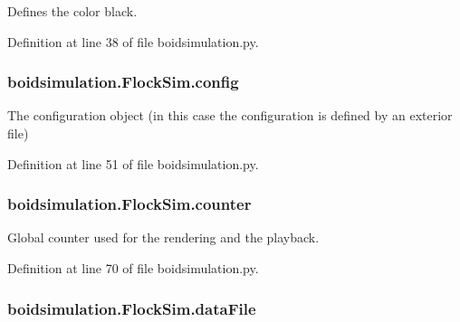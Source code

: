 Defines the color black. 



Definition at line 38 of file boidsimulation.\-py.

\hypertarget{classboidsimulation_1_1FlockSim_abf487d6e84851334a79656b5df3c8492}{
\subsubsection[{config}]{\setlength{\rightskip}{0pt plus 5cm}boidsimulation.\-Flock\-Sim.\-config}}\label{classboidsimulation_1_1FlockSim_abf487d6e84851334a79656b5df3c8492}


The configuration object (in this case the configuration is defined by an exterior file) 



Definition at line 51 of file boidsimulation.\-py.

\hypertarget{classboidsimulation_1_1FlockSim_af378fd310919691dec50f5d312931726}{
\subsubsection[{counter}]{\setlength{\rightskip}{0pt plus 5cm}boidsimulation.\-Flock\-Sim.\-counter}}\label{classboidsimulation_1_1FlockSim_af378fd310919691dec50f5d312931726}


Global counter used for the rendering and the playback. 



Definition at line 70 of file boidsimulation.\-py.

\hypertarget{classboidsimulation_1_1FlockSim_a96885e067ac2333f807eaa9580a2ece4}{
\subsubsection[{data\-File}]{\setlength{\rightskip}{0pt plus 5cm}boidsimulation.\-Flock\-Sim.\-data\-File}}\label{classboidsimulation_1_1FlockSim_a96885e067ac2333f807eaa9580a2ece4}


